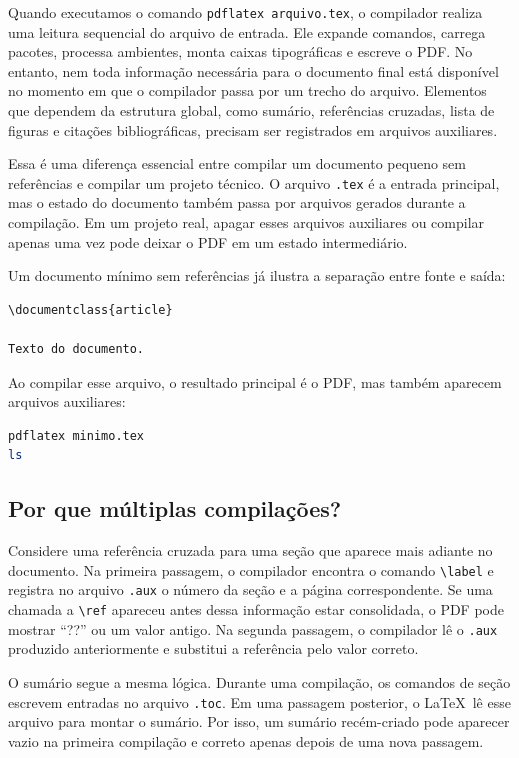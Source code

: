 Quando executamos o comando \texttt{pdflatex arquivo.tex}, o compilador realiza uma leitura sequencial do arquivo de entrada. Ele expande comandos, carrega pacotes, processa ambientes, monta caixas tipográficas e escreve o PDF. No entanto, nem toda informação necessária para o documento final está disponível no momento em que o compilador passa por um trecho do arquivo. Elementos que dependem da estrutura global, como sumário, referências cruzadas, lista de figuras e citações bibliográficas, precisam ser registrados em arquivos auxiliares.

Essa é uma diferença essencial entre compilar um documento pequeno sem referências e compilar um projeto técnico. O arquivo \texttt{.tex} é a entrada principal, mas o estado do documento também passa por arquivos gerados durante a compilação. Em um projeto real, apagar esses arquivos auxiliares ou compilar apenas uma vez pode deixar o PDF em um estado intermediário.

Um documento mínimo sem referências já ilustra a separação entre fonte e saída:

\begin{lstlisting}[language={[latex]TeX}, caption={Documento mínimo}]
\documentclass{article}

Texto do documento.

\end{lstlisting}

Ao compilar esse arquivo, o resultado principal é o PDF, mas também aparecem arquivos auxiliares:

\begin{lstlisting}[language=bash, caption={Primeira compilação manual}]
pdflatex minimo.tex
ls
\end{lstlisting}

\subsection{Por que múltiplas compilações?}
Considere uma referência cruzada para uma seção que aparece mais adiante no documento. Na primeira passagem, o compilador encontra o comando \verb|\label| e registra no arquivo \texttt{.aux} o número da seção e a página correspondente. Se uma chamada a \verb|\ref| apareceu antes dessa informação estar consolidada, o PDF pode mostrar ``??'' ou um valor antigo. Na segunda passagem, o compilador lê o \texttt{.aux} produzido anteriormente e substitui a referência pelo valor correto.

O sumário segue a mesma lógica. Durante uma compilação, os comandos de seção escrevem entradas no arquivo \texttt{.toc}. Em uma passagem posterior, o \LaTeX\ lê esse arquivo para montar o sumário. Por isso, um sumário recém-criado pode aparecer vazio na primeira compilação e correto apenas depois de uma nova passagem.

